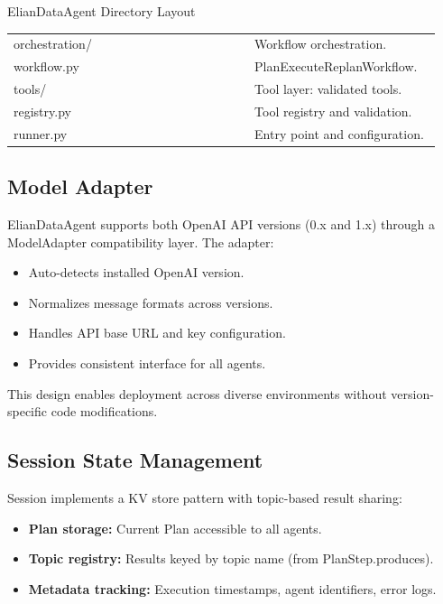 \documentclass{article}
\theoremstyle{definition}
\begin{document}
\begin{layoutbox}{ElianDataAgent Directory Layout}
\begin{tabular}{p{0.53\linewidth} p{0.41\linewidth}}
\ttfamily\hspace*{1em}orchestration/ & Workflow orchestration. \\
\ttfamily\hspace*{2em}workflow.py & PlanExecuteReplanWorkflow. \\
\ttfamily\hspace*{1em}tools/ & Tool layer: validated tools. \\
\ttfamily\hspace*{2em}registry.py & Tool registry and validation. \\
\ttfamily\hspace*{1em}runner.py & Entry point and configuration. \\
\end{tabular}
\end{layoutbox}

\subsection{Model Adapter}

ElianDataAgent supports both OpenAI API versions (0.x and 1.x) through a ModelAdapter compatibility layer. The adapter:
\begin{itemize}[leftmargin=1.5em]
    \item Auto-detects installed OpenAI version.
    \item Normalizes message formats across versions.
    \item Handles API base URL and key configuration.
    \item Provides consistent interface for all agents.
\end{itemize}

This design enables deployment across diverse environments without version-specific code modifications.

\subsection{Session State Management}

Session implements a KV store pattern with topic-based result sharing:

\begin{itemize}[leftmargin=1.5em]
    \item \textbf{Plan storage:} Current Plan accessible to all agents.
    \item \textbf{Topic registry:} Results keyed by topic name (from PlanStep.produces).
    \item \textbf{Metadata tracking:} Execution timestamps, agent identifiers, error logs.
\end{itemize}
\end{document}
